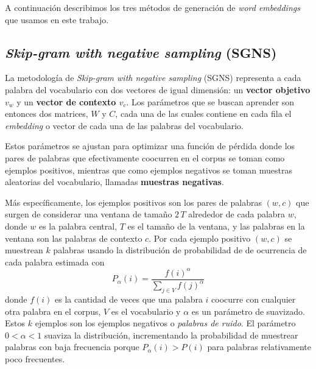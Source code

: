 A continuación describimos los tres métodos de generación de \emph{word embeddings} que usamos en este trabajo.

\subsection{\emph{Skip-gram with negative sampling} (SGNS)} \label{sec:sgns}

La metodología de \emph{Skip-gram with negative sampling} (SGNS) \citep{mikolov2013distributed} representa a cada palabra del vocabulario con dos vectores de igual dimensión: un \textbf{vector objetivo $v_w$} y un \textbf{vector de contexto $v_c$}. Los parámetros que se buscan aprender son entonces dos matrices, $W$ y $C$, cada una de las cuales contiene en cada fila el \emph{embedding} o vector de cada una de las palabras del vocabulario. 

Estos parámetros se ajustan para optimizar una función de pérdida donde los pares de palabras que efectivamente coocurren en el corpus se toman como ejemplos positivos, mientras que como ejemplos negativos se toman muestras aleatorias del vocabulario, llamadas \textbf{muestras negativas}.

Más específicamente, los ejemplos positivos son los pares de palabras $(w,c)$ que surgen de considerar una ventana de tamaño $2\,T$ alrededor de cada palabra $w$, donde $w$ es la palabra central, $T$ es el tamaño de la ventana, y las palabras en la ventana son las palabras de contexto $c$. Por cada ejemplo positivo $(w,c)$ se muestrean $k$ palabras usando la distribución de probabilidad de de ocurrencia de cada palabra estimada con  
%
\begin{equation}
    P_{\alpha}(i) = \frac{f(i)^{\alpha}}{\sum_{j \in V} f(j)^{\alpha}}
\end{equation}
%
donde $f(i)$ es la cantidad de veces que una palabra $i$ coocurre con cualquier otra palabra en el corpus, $V$ es el vocabulario y $\alpha$ es un parámetro de suavizado. Estos $k$ ejemplos son los ejemplos negativos o \emph{palabras de ruido}. El parámetro $0 < \alpha < 1$ suaviza la distribución, incrementando la probabilidad de muestrear palabras con baja frecuencia porque $P_{\alpha}(i) > P(i)$ para palabras relativamente poco frecuentes. 


